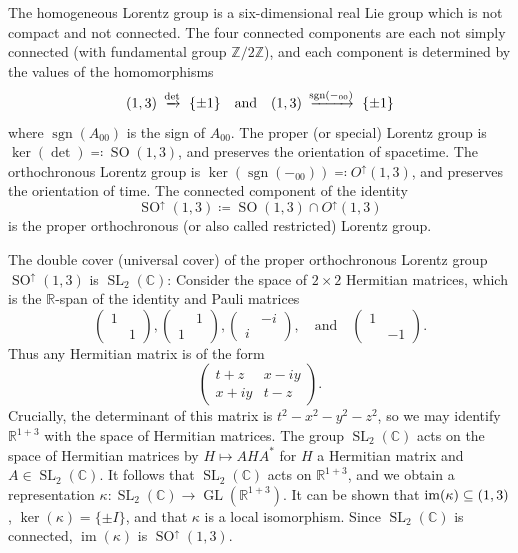 \documentclass[11pt,leqno]{article}
\theoremstyle{plain}
\theoremstyle{definition}
\numberwithin{equation}{section}
\numberwithin{lem}{section}
\DeclareMathOperator{\GL}{GL}
\DeclareMathOperator{\sgn}{sgn}
\DeclareMathOperator{\SL}{SL}
\DeclareMathOperator{\im}{im}
\let\O\relax
\DeclareMathOperator{\O}{O}
\DeclareMathOperator{\SO}{SO}
\begin{document}
The homogeneous Lorentz group is a six-dimensional real Lie group which is not compact and not connected. The four connected components are each not simply connected (with fundamental group $\mathbb Z/2\mathbb Z$), and each component is determined by the values of the homomorphisms
\[\O(1,3)\xrightarrow{\det}\{\pm 1\}\quad\text{and}\quad \O(1,3)\xrightarrow{\sgn(-_{00})}\{\pm 1\}\]
where $\sgn(A_{00})$ is the sign of $A_{00}$. The proper (or special) Lorentz group is $\ker(\det) \eqqcolon \SO(1,3)$, and preserves the orientation of spacetime. The orthochronous Lorentz group is $\ker(\sgn(-_{00})) \eqqcolon O^\uparrow(1,3)$, and preserves the orientation of time. The connected component of the identity 
\[\SO^\uparrow(1,3)\coloneqq \SO(1,3)\cap O^\uparrow(1,3)\]
is the proper orthochronous (or also called restricted) Lorentz group.

The double cover (universal cover) of the proper orthochronous Lorentz group $\SO^\uparrow(1,3)$ is $\SL_2(\mathbb C)$: Consider the space of $2\times 2$ Hermitian matrices, which is the $\mathbb R$-span of the identity and Pauli matrices
\[\begin{pmatrix}
	1 & \\ & 1
\end{pmatrix}, \begin{pmatrix}
	& 1 \\ 1 & 
\end{pmatrix}, \begin{pmatrix}
	& -i \\ i & 
\end{pmatrix},\quad\text{and}\quad \begin{pmatrix}
	1 & \\ & -1
\end{pmatrix}.\]
Thus any Hermitian matrix is of the form
\[\begin{pmatrix}
	t+z & x-iy \\ x+iy & t-z
\end{pmatrix}.\] Crucially, the determinant of this matrix is $t^2-x^2-y^2-z^2$, so we may identify $\mathbb R^{1+3}$ with the space of Hermitian matrices. The group $\SL_2(\mathbb C)$ acts on the space of Hermitian matrices by $H\mapsto A H A^\ast$ for $H$ a Hermitian matrix and $A\in \SL_2(\mathbb C)$. It follows that $\SL_2(\mathbb C)$ acts on $\mathbb R^{1+3}$, and we obtain a representation $\kappa\colon \SL_2(\mathbb C)\to \GL(\mathbb R^{1+3})$. It can be shown that $\im(\kappa)\subseteq \O(1,3)$, $\ker(\kappa) = \{\pm I\}$, and that $\kappa$ is a local isomorphism. Since $\SL_2(\mathbb C)$ is connected, $\im(\kappa)$ is $\SO^\uparrow(1,3)$.
\end{document}
